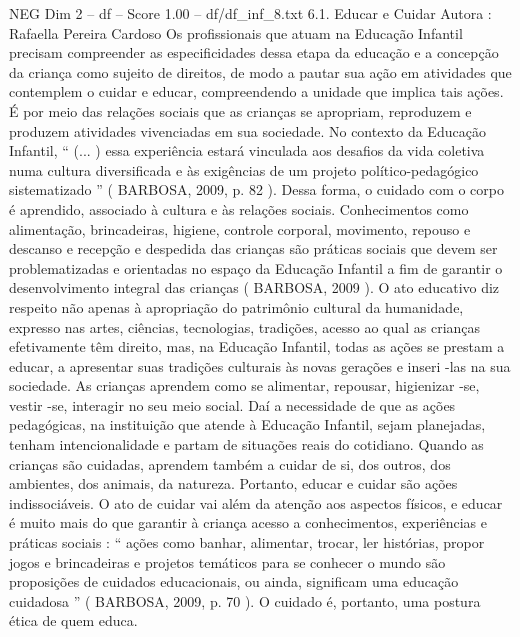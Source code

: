 \begin{textsample}{NEG Dim 2 – df – Score 1.00 – df/df\_inf\_8.txt}  \label{ex:f2_neg_169}
6.1.
Educar e Cuidar Autora : Rafaella Pereira Cardoso Os profissionais que atuam na Educação Infantil precisam compreender as especificidades dessa etapa da educação e a concepção da criança como sujeito de direitos, de modo a pautar sua ação em atividades que contemplem o cuidar e educar, compreendendo a unidade que implica tais ações.
É por meio das relações sociais que as crianças se apropriam, reproduzem e produzem atividades vivenciadas em sua sociedade.
No contexto da Educação Infantil, “ (... ) essa experiência estará vinculada aos desafios da vida coletiva numa cultura diversificada e às exigências de um projeto político-pedagógico sistematizado ” ( BARBOSA, 2009, p. 82 ).
Dessa forma, o cuidado com o corpo é aprendido, associado à cultura e às relações sociais.
Conhecimentos como alimentação, brincadeiras, higiene, controle corporal, movimento, repouso e descanso e recepção e despedida das crianças são práticas sociais que devem ser problematizadas e orientadas no espaço da Educação Infantil a fim de garantir o desenvolvimento integral das crianças ( BARBOSA, 2009 ).
O ato educativo diz respeito não apenas à apropriação do patrimônio cultural da humanidade, expresso nas artes, ciências, tecnologias, tradições, acesso ao qual as crianças efetivamente têm direito, mas, na Educação Infantil, todas as ações se prestam a educar, a apresentar suas tradições culturais às novas gerações e inseri -las na sua sociedade.
As crianças aprendem como se alimentar, repousar, higienizar -se, vestir -se, interagir no seu meio social.
Daí a necessidade de que as ações pedagógicas, na instituição que atende à Educação Infantil, sejam planejadas, tenham intencionalidade e partam de situações reais do cotidiano.
Quando as crianças são cuidadas, aprendem também a cuidar de si, dos outros, dos ambientes, dos animais, da natureza.
Portanto, educar e cuidar são ações indissociáveis.
O ato de cuidar vai além da atenção aos aspectos físicos, e educar é muito mais do que garantir à criança acesso a conhecimentos, experiências e práticas sociais : “ ações como banhar, alimentar, trocar, ler histórias, propor jogos e brincadeiras e projetos temáticos para se conhecer o mundo são proposições de cuidados educacionais, ou ainda, significam uma educação cuidadosa ” ( BARBOSA, 2009, p. 70 ).
O cuidado é, portanto, uma postura ética de quem educa.

\end{textsample}
